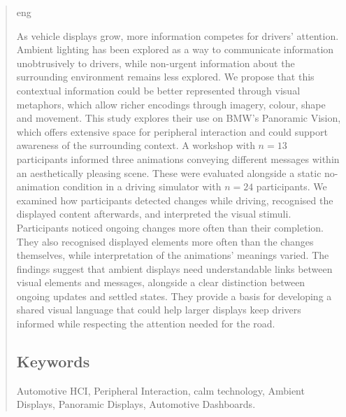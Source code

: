 \documentclass[
english,                 %
bibtex,                  %
includeExtraAbstracts, %
]{kththesis}
\numberwithin{listing}{chapter}
\begin{document}
\setlength{\emergencystretch}{2em}
\raggedbottom
\setlength{\intextsep}{7pt plus 2pt minus 1pt}
\setlength{\textfloatsep}{10pt plus 2pt minus 2pt}
\setlength{\floatsep}{8pt plus 2pt minus 2pt}

{\hfuzz=18pt\kthcover}
\titlepage
\bookinfopage

\frontmatter
\setcounter{page}{1}

\begin{abstract}
  \markboth{\abstractname}{}
\begin{scontents}[store-env=lang]
eng
\end{scontents}
\begin{scontents}[store-env=abstracts,print-env=true]
As vehicle displays grow, more information competes for drivers’ attention. Ambient lighting has been explored as a way to communicate information unobtrusively to drivers, while non-urgent information about the surrounding environment remains less explored. We propose that this contextual information could be better represented through visual metaphors, which allow richer encodings through imagery, colour, shape and movement. This study explores their use on BMW’s Panoramic Vision, which offers extensive space for peripheral interaction and could support awareness of the surrounding context. A workshop with $n = 13$ participants informed three animations conveying different messages within an aesthetically pleasing scene. These were evaluated alongside a static no-animation condition in a driving simulator with $n = 24$ participants. We examined how participants detected changes while driving, recognised the displayed content afterwards, and interpreted the visual stimuli. Participants noticed ongoing changes more often than their completion. They also recognised displayed elements more often than the changes themselves, while interpretation of the animations’ meanings varied. The findings suggest that ambient displays need understandable links between visual elements and messages, alongside a clear distinction between ongoing updates and settled states. They provide a basis for developing a shared visual language that could help larger displays keep drivers informed while respecting the attention needed for the road.
\end{scontents}
\subsection*{Keywords}
\begin{scontents}[store-env=keywords,print-env=true]
Automotive HCI, Peripheral Interaction, calm technology, Ambient Displays, Panoramic Displays, Automotive Dashboards.
\end{scontents}
\end{abstract}
\clearpage
\end{document}
